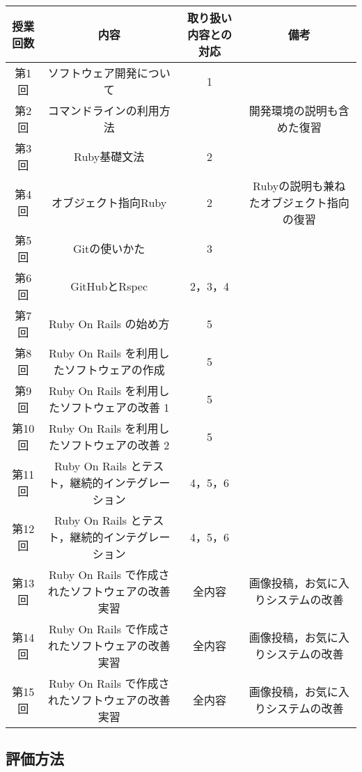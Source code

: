 \begin{table}[ht]
  \begin{center}
    \begin{tabular}{|c|c|c|c|}
      \hline
      授業回数 & 内容 & 取り扱い内容との対応 & 備考 \\
      \hline
      第1回 & ソフトウェア開発について & 1 &  \\
      \hline
      第2回 & コマンドラインの利用方法 &  &  開発環境の説明も含めた復習 \\
      \hline
      第3回 & Ruby基礎文法 &  2 &  \\
      \hline
      第4回 & オブジェクト指向Ruby & 2 & Rubyの説明も兼ねたオブジェクト指向の復習 \\
      \hline
      第5回 & Gitの使いかた & 3 & \\
      \hline
      第6回 & GitHubとRspec & 2，3，4 &  \\
      \hline
      第7回 & Ruby On Rails の始め方 & 5 &  \\
      \hline
      第8回 & Ruby On Rails を利用したソフトウェアの作成 & 5 & \\
      \hline
      第9回 & Ruby On Rails を利用したソフトウェアの改善 1 & 5 & \\
      \hline
      第10回 & Ruby On Rails を利用したソフトウェアの改善 2 & 5 & \\
      \hline
      第11回 & Ruby On Rails とテスト，継続的インテグレーション & 4，5，6 & \\
      \hline
      第12回 & Ruby On Rails とテスト，継続的インテグレーション & 4，5，6 & \\
      \hline
      第13回 & Ruby On Rails で作成されたソフトウェアの改善実習 & 全内容 & 画像投稿，お気に入りシステムの改善\\
      \hline
      第14回 & Ruby On Rails で作成されたソフトウェアの改善実習 & 全内容 & 画像投稿，お気に入りシステムの改善\\
      \hline
      第15回 & Ruby On Rails で作成されたソフトウェアの改善実習 & 全内容 & 画像投稿，お気に入りシステムの改善\\
      \hline
    \end{tabular}
  \end{center}
\end{table}

\subsection{評価方法}

